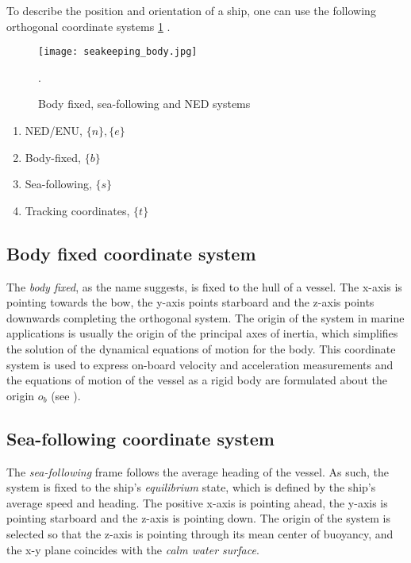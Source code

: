 To describe the position and orientation of a ship, one can use the following orthogonal coordinate systems  \cref{fig:ownship_frames} \cite{Perez2007} .


\begin{figure}[H] 	
	\centering
	\texttt{[image: seakeeping\_body.jpg]}
	\caption{Body fixed, sea-following and NED systems \cite{Perez2007}}.
	\label{fig:ownship_frames}	
\end{figure}

\begin{enumerate}
	\item NED/ENU, $\{n\} , \{e\}$
	\item Body-fixed, $\{b\}$
	\item Sea-following, $\{s\}$
	\item Tracking coordinates, $\{t\}$
\end{enumerate}



\subsection{Body fixed coordinate system}


The \emph{body fixed}, as the name suggests, is fixed to the hull of a vessel. The x-axis is pointing towards the bow, the y-axis points starboard and the z-axis points downwards completing the orthogonal system. The origin of the system in marine applications is usually the origin of the principal axes of inertia, which simplifies the solution of the dynamical equations of motion for the body. This coordinate system is used to express on-board velocity and acceleration measurements and the equations of motion of the vessel as a rigid body are formulated about the origin $o_{b}$ (see ).

\subsection{Sea-following coordinate system}

The \emph{sea-following} frame follows the average heading of the vessel. As such, the system is fixed to the ship's \emph{equilibrium} state, which is defined by the ship's average speed and heading. The positive x-axis is pointing ahead, the y-axis is pointing starboard and the z-axis is pointing down. The origin of the system is selected so that the z-axis is pointing through its mean center of buoyancy, and the x-y plane coincides with the \emph{calm water surface}.

